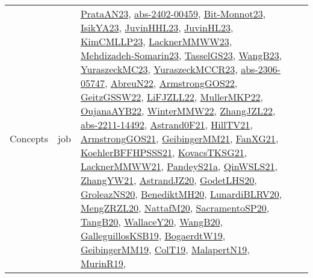 {\begin{longtable}{lp{3cm}>{\raggedright}p{6cm}>{\raggedright}p{6cm}p{8cm}}
Concepts & job & \href{articles/PrataAN23.pdf}{PrataAN23}\cite{PrataAN23}, \href{articles/abs-2402-00459.pdf}{abs-2402-00459}\cite{abs-2402-00459}, \href{papers/Bit-Monnot23.pdf}{Bit-Monnot23}\cite{Bit-Monnot23}, \href{articles/IsikYA23.pdf}{IsikYA23}\cite{IsikYA23}, \href{papers/JuvinHHL23.pdf}{JuvinHHL23}\cite{JuvinHHL23}, \href{papers/JuvinHL23.pdf}{JuvinHL23}\cite{JuvinHL23}, \href{papers/KimCMLLP23.pdf}{KimCMLLP23}\cite{KimCMLLP23}, \href{articles/LacknerMMWW23.pdf}{LacknerMMWW23}\cite{LacknerMMWW23}, \href{papers/Mehdizadeh-Somarin23.pdf}{Mehdizadeh-Somarin23}\cite{Mehdizadeh-Somarin23}, \href{papers/TasselGS23.pdf}{TasselGS23}\cite{TasselGS23}, \href{papers/WangB23.pdf}{WangB23}\cite{WangB23}, \href{papers/YuraszeckMC23.pdf}{YuraszeckMC23}\cite{YuraszeckMC23}, \href{articles/YuraszeckMCCR23.pdf}{YuraszeckMCCR23}\cite{YuraszeckMCCR23}, \href{articles/abs-2306-05747.pdf}{abs-2306-05747}\cite{abs-2306-05747}, \href{articles/AbreuN22.pdf}{AbreuN22}\cite{AbreuN22}, \href{papers/ArmstrongGOS22.pdf}{ArmstrongGOS22}\cite{ArmstrongGOS22}, \href{papers/GeitzGSSW22.pdf}{GeitzGSSW22}\cite{GeitzGSSW22}, \href{papers/LiFJZLL22.pdf}{LiFJZLL22}\cite{LiFJZLL22}, \href{articles/MullerMKP22.pdf}{MullerMKP22}\cite{MullerMKP22}, \href{papers/OujanaAYB22.pdf}{OujanaAYB22}\cite{OujanaAYB22}, \href{papers/WinterMMW22.pdf}{WinterMMW22}\cite{WinterMMW22}, \href{papers/ZhangJZL22.pdf}{ZhangJZL22}\cite{ZhangJZL22}, \href{articles/abs-2211-14492.pdf}{abs-2211-14492}\cite{abs-2211-14492}, \href{papers/Astrand0F21.pdf}{Astrand0F21}\cite{Astrand0F21}, \href{papers/HillTV21.pdf}{HillTV21}\cite{HillTV21}, \href{papers/ArmstrongGOS21.pdf}{ArmstrongGOS21}\cite{ArmstrongGOS21}, \href{papers/GeibingerMM21.pdf}{GeibingerMM21}\cite{GeibingerMM21}, \href{articles/FanXG21.pdf}{FanXG21}\cite{FanXG21}, \href{articles/KoehlerBFFHPSSS21.pdf}{KoehlerBFFHPSSS21}\cite{KoehlerBFFHPSSS21}, \href{papers/KovacsTKSG21.pdf}{KovacsTKSG21}\cite{KovacsTKSG21}, \href{papers/LacknerMMWW21.pdf}{LacknerMMWW21}\cite{LacknerMMWW21}, \href{articles/PandeyS21a.pdf}{PandeyS21a}\cite{PandeyS21a}, \href{articles/QinWSLS21.pdf}{QinWSLS21}\cite{QinWSLS21}, \href{articles/ZhangYW21.pdf}{ZhangYW21}\cite{ZhangYW21}, \href{articles/AstrandJZ20.pdf}{AstrandJZ20}\cite{AstrandJZ20}, \href{papers/GodetLHS20.pdf}{GodetLHS20}\cite{GodetLHS20}, \href{papers/GroleazNS20.pdf}{GroleazNS20}\cite{GroleazNS20}, \href{articles/BenediktMH20.pdf}{BenediktMH20}\cite{BenediktMH20}, \href{articles/LunardiBLRV20.pdf}{LunardiBLRV20}\cite{LunardiBLRV20}, \href{articles/MengZRZL20.pdf}{MengZRZL20}\cite{MengZRZL20}, \href{papers/NattafM20.pdf}{NattafM20}\cite{NattafM20}, \href{articles/SacramentoSP20.pdf}{SacramentoSP20}\cite{SacramentoSP20}, \href{papers/TangB20.pdf}{TangB20}\cite{TangB20}, \href{articles/WallaceY20.pdf}{WallaceY20}\cite{WallaceY20}, \href{papers/WangB20.pdf}{WangB20}\cite{WangB20}, \href{papers/GalleguillosKSB19.pdf}{GalleguillosKSB19}\cite{GalleguillosKSB19}, \href{papers/BogaerdtW19.pdf}{BogaerdtW19}\cite{BogaerdtW19}, \href{papers/GeibingerMM19.pdf}{GeibingerMM19}\cite{GeibingerMM19}, \href{papers/ColT19.pdf}{ColT19}\cite{ColT19}, \href{papers/MalapertN19.pdf}{MalapertN19}\cite{MalapertN19}, \href{papers/MurinR19.pdf}{MurinR19}\cite{MurinR19}, 
\end{longtable}}
